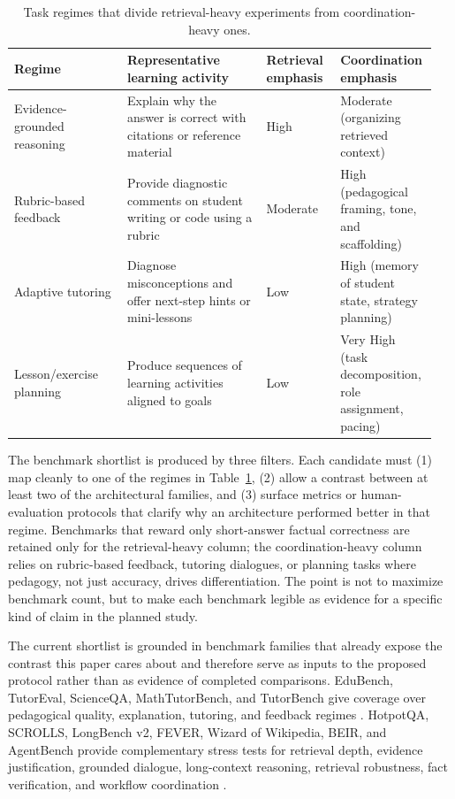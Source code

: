 \begin{table}[t]
\centering
\small
\begingroup
\setlength{\tabcolsep}{4pt}
\begin{tabular}{@{}>{\raggedright\arraybackslash}p{0.26\linewidth}>{\raggedright\arraybackslash}p{0.32\linewidth}>{\raggedright\arraybackslash}p{0.17\linewidth}>{\raggedright\arraybackslash}p{0.2\linewidth}@{}}
\toprule
Regime & Representative learning activity & \shortstack[c]{Retrieval\\emphasis} & \shortstack[c]{Coordination\\emphasis} \\
\midrule
Evidence-grounded reasoning & Explain why the answer is correct with citations or reference material & High & Moderate (organizing retrieved context) \\
Rubric-based feedback & Provide diagnostic comments on student writing or code using a rubric & Moderate & High (pedagogical framing, tone, and scaffolding) \\
Adaptive tutoring & Diagnose misconceptions and offer next-step hints or mini-lessons & Low & High (memory of student state, strategy planning) \\
Lesson/exercise planning & Produce sequences of learning activities aligned to goals & Low & Very High (task decomposition, role assignment, pacing) \\
\bottomrule
\end{tabular}
\endgroup
\caption{Task regimes that divide retrieval-heavy experiments from coordination-heavy ones.}
\label{tab:task-regimes}
\end{table}

The benchmark shortlist is produced by three filters. Each candidate must (1) map cleanly to one of the regimes in Table~\ref{tab:task-regimes}, (2) allow a contrast between at least two of the architectural families, and (3) surface metrics or human-evaluation protocols that clarify why an architecture performed better in that regime. Benchmarks that reward only short-answer factual correctness are retained only for the retrieval-heavy column; the coordination-heavy column relies on rubric-based feedback, tutoring dialogues, or planning tasks where pedagogy, not just accuracy, drives differentiation. The point is not to maximize benchmark count, but to make each benchmark legible as evidence for a specific kind of claim in the planned study.

The current shortlist is grounded in benchmark families that already expose the contrast this paper cares about and therefore serve as inputs to the proposed protocol rather than as evidence of completed comparisons. EduBench, TutorEval, ScienceQA, MathTutorBench, and TutorBench give coverage over pedagogical quality, explanation, tutoring, and feedback regimes \cite{xu2025edubench,chevalier2024sciencetutors,lu2022scienceqa,macina2025mathtutorbench,srinivasa2025tutorbench}. HotpotQA, SCROLLS, LongBench v2, FEVER, Wizard of Wikipedia, BEIR, and AgentBench provide complementary stress tests for retrieval depth, evidence justification, grounded dialogue, long-context reasoning, retrieval robustness, fact verification, and workflow coordination \cite{yang2018hotpotqa,shaham2022scrolls,bai2024longbench2,thorne2018fever,dinan2019wizard,thakur2021beir,liu2023agentbench}.

